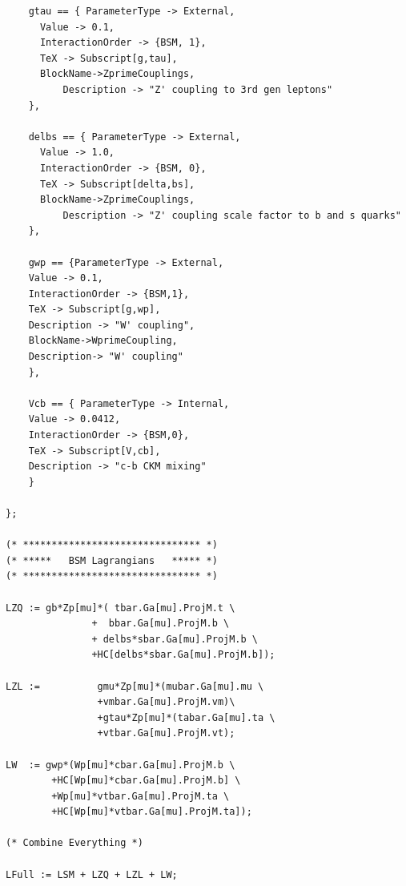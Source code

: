 \begin{verbatim}
	gtau == { ParameterType -> External, 
	  Value -> 0.1,
	  InteractionOrder -> {BSM, 1}, 
	  TeX -> Subscript[g,tau], 
	  BlockName->ZprimeCouplings,
          Description -> "Z' coupling to 3rd gen leptons"
	},
	
	delbs == { ParameterType -> External, 
	  Value -> 1.0,
	  InteractionOrder -> {BSM, 0}, 
	  TeX -> Subscript[delta,bs], 
	  BlockName->ZprimeCouplings,
          Description -> "Z' coupling scale factor to b and s quarks"
	},
	
	gwp == {ParameterType -> External,
	Value -> 0.1,
	InteractionOrder -> {BSM,1},
	TeX -> Subscript[g,wp],
	Description -> "W' coupling",
	BlockName->WprimeCoupling,
	Description-> "W' coupling"
	},
	
	Vcb == { ParameterType -> Internal,
	Value -> 0.0412,
	InteractionOrder -> {BSM,0},
	TeX -> Subscript[V,cb],
	Description -> "c-b CKM mixing"
	}

};

(* ******************************* *)
(* *****   BSM Lagrangians   ***** *)
(* ******************************* *)

LZQ := gb*Zp[mu]*( tbar.Ga[mu].ProjM.t \
			   +  bbar.Ga[mu].ProjM.b \
			   + delbs*sbar.Ga[mu].ProjM.b \
			   +HC[delbs*sbar.Ga[mu].ProjM.b]);
			   
LZL := 			gmu*Zp[mu]*(mubar.Ga[mu].mu \
				+vmbar.Ga[mu].ProjM.vm)\
				+gtau*Zp[mu]*(tabar.Ga[mu].ta \
				+vtbar.Ga[mu].ProjM.vt);
				
LW  := gwp*(Wp[mu]*cbar.Ga[mu].ProjM.b \
		+HC[Wp[mu]*cbar.Ga[mu].ProjM.b] \
		+Wp[mu]*vtbar.Ga[mu].ProjM.ta \
		+HC[Wp[mu]*vtbar.Ga[mu].ProjM.ta]);

(* Combine Everything *)

LFull := LSM + LZQ + LZL + LW;
\end{verbatim}
\newpage
